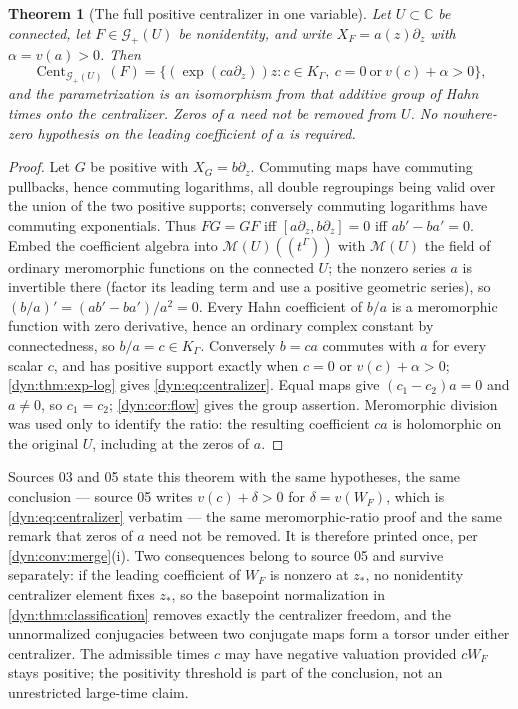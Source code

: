 \documentclass[11pt,letterpaper]{article}
\newtheorem{theorem}{Theorem}[section]
\theoremstyle{definition}
\theoremstyle{remark}
\newcommand{\C}{\mathbb C}
\newcommand{\MM}{\mathcal M}
\newcommand{\GG}{\mathscr G}
\newcommand{\Cent}{\operatorname{Cent}}
\numberwithin{equation}{section}
\begin{document}
\begin{theorem}[The full positive centralizer in one variable]
\label{dyn:thm:centralizer}
Let $U\subset\C$ be connected, let $F\in\GG_+(U)$ be nonidentity, and write
$X_F=a(z)\partial_z$ with $\alpha=v(a)>0$. Then
\begin{equation}\label{dyn:eq:centralizer}
 \Cent_{\GG_+(U)}(F)=\bigl\{(\exp(ca\partial_z))z:
 c\in K_\Gamma,\ c=0\ \text{or}\ v(c)+\alpha>0\bigr\},
\end{equation}
and the parametrization is an isomorphism from that additive group of Hahn
times onto the centralizer. Zeros of $a$ need \emph{not} be removed from
$U$. No nowhere-zero hypothesis on the leading coefficient of $a$ is
required.
\end{theorem}
\begin{proof}
Let $G$ be positive with $X_G=b\partial_z$. Commuting maps have commuting
pullbacks, hence commuting logarithms, all double regroupings being valid
over the union of the two positive supports; conversely commuting
logarithms have commuting exponentials. Thus $FG=GF$ iff
$[a\partial_z,b\partial_z]=0$ iff $ab'-ba'=0$. Embed the coefficient
algebra into $\MM(U)((t^{\Gamma}))$ with $\MM(U)$ the field of ordinary
meromorphic functions on the connected $U$; the nonzero series $a$ is
invertible there (factor its leading term and use a positive geometric
series), so $(b/a)'=(ab'-ba')/a^{2}=0$. Every Hahn coefficient of $b/a$ is
a meromorphic function with zero derivative, hence an ordinary complex
constant by connectedness, so $b/a=c\in K_\Gamma$. Conversely $b=ca$
commutes with $a$ for every scalar $c$, and has positive support exactly
when $c=0$ or $v(c)+\alpha>0$; \cref{dyn:thm:exp-log} gives
\eqref{dyn:eq:centralizer}. Equal maps give $(c_1-c_2)a=0$ and $a\ne0$, so
$c_1=c_2$; \cref{dyn:cor:flow} gives the group assertion. Meromorphic
division was used only to identify the ratio: the resulting coefficient
$ca$ is holomorphic on the original $U$, including at the zeros of $a$.
\end{proof}

Sources 03 and 05 state this theorem with the same hypotheses, the same
conclusion --- source 05 writes $v(c)+\delta>0$ for $\delta=v(W_F)$, which
is \eqref{dyn:eq:centralizer} verbatim --- the same meromorphic-ratio proof
and the same remark that zeros of $a$ need not be removed. It is therefore
printed once, per \cref{dyn:conv:merge}(i). Two consequences belong to
source 05 and survive separately: if the leading coefficient of $W_F$ is
nonzero at $z_{*}$, no nonidentity centralizer element fixes $z_{*}$, so
the basepoint normalization in \cref{dyn:thm:classification} removes
exactly the centralizer freedom, and the unnormalized conjugacies between
two conjugate maps form a torsor under either centralizer. The admissible
times $c$ may have negative valuation provided $cW_F$ stays positive; the
positivity threshold is part of the conclusion, not an unrestricted
large-time claim.
\end{document}
